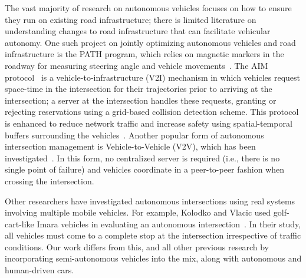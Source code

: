The vast majority of research on autonomous vehicles focuses on how to
ensure they run on existing road infrastructure; there is limited
literature on understanding changes to road infrastructure that can
facilitate vehicular autonomy.  One such project on jointly optimizing
autonomous vehicles and road infrastructure is the PATH program, which
relies on magnetic markers in the roadway for measuring steering angle
and vehicle movements~\cite{bib:Shladover91Automated}.  The
AIM protocol~\cite{bib:Dresner08Multiagent, bib:Fajardo12Automated,
bib:Quinlan10Bringing} is a vehicle-to-infrastructure (V2I) mechanism in
which vehicles request space-time in the intersection for their
trajectories prior to arriving at the intersection; a server at the
intersection handles these requests, granting or rejecting
reservations using a grid-based collision detection scheme. This
protocol is enhanced to reduce network traffic and increase safety
using spatial-temporal buffers surrounding the vehicles~\cite{bib:Fajardo12Automated}.
Another popular form of autonomous intersection management
is Vehicle-to-Vehicle (V2V), which has been investigated~\cite{naumann97:intersection,
ATT08-vanmiddlesworth}.  In this form, no centralized server is
required (i.e., there is no single point of failure) and vehicles
coordinate in a peer-to-peer fashion when crossing the
intersection.


Other researchers have investigated autonomous intersections using
real systems involving multiple mobile vehicles.  For example, Kolodko
and Vlacic used golf-cart-like Imara vehicles in evaluating an
autonomous intersection~\cite{Kolodko03:INRIA}.  In their study, all
vehicles must come to a complete stop at the intersection irrespective
of traffic conditions.  Our work differs from this, and all other
previous research by incorporating semi-autonomous vehicles into the
mix, along with autonomous and human-driven cars.



